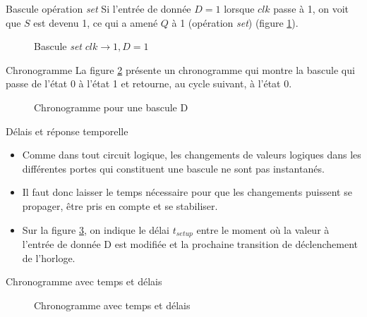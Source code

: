 \documentclass[presentation]{beamer}
\begin{document}
\begin{frame}[label={sec:orgcc241b6}]{Bascule opération \emph{set}}
Si l'entrée de donnée \(D = 1\) lorsque \(clk\) passe à 1, on voit
que \(S\) est devenu 1, ce qui a amené \(Q\) à 1 (opération \emph{set})
(figure \ref{fig:org3da7cc1}).

\begin{figure}[htbp]
\centering

\caption{\label{fig:org3da7cc1}Bascule  \emph{set} \(clk \rightarrow 1, D=1\)}
\end{figure}
\end{frame}

\begin{frame}[label={sec:org5cb18d1}]{Chronogramme}
La figure \ref{fig:org0fb9839} présente un chronogramme qui montre la bascule
qui passe de l'état 0 à l'état 1 et retourne, au cycle suivant, à
l'état 0.

\begin{figure}[htbp]
\centering

\caption{\label{fig:org0fb9839}Chronogramme pour une bascule D}
\end{figure}
\end{frame}

\begin{frame}[label={sec:orgbf04098}]{Délais et réponse temporelle}
\begin{itemize}
\item Comme dans tout circuit logique, les changements de valeurs logiques dans les différentes portes qui constituent une bascule ne sont pas instantanés.

\item Il faut donc laisser le temps nécessaire pour que les changements puissent se propager, être pris en compte et se stabiliser.

\item Sur la figure \ref{fig:orgdc1b637}, on indique le délai \(t_{setup}\) entre le moment où la valeur à l'entrée de donnée D est modifiée et la prochaine transition de déclenchement de l'horloge.
\end{itemize}
\end{frame}

\begin{frame}[label={sec:orgb836f60}]{Chronogramme avec temps et délais}
\begin{figure}[htbp]
\centering

\caption{\label{fig:orgdc1b637}Chronogramme avec temps et délais}
\end{figure}
\end{frame}
\end{document}
